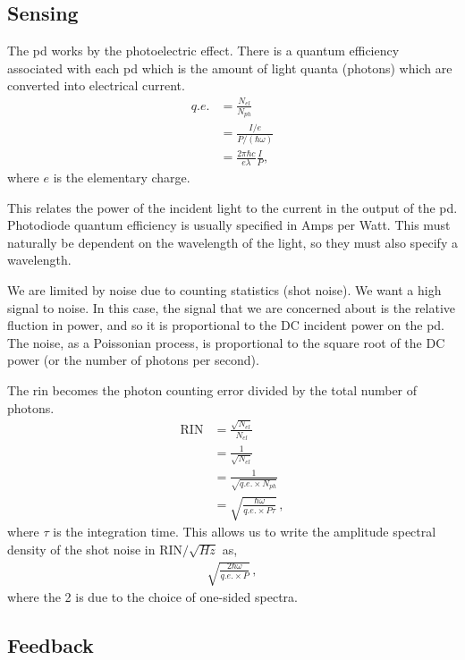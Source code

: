 \subsection{Sensing}

The \ac{pd} works by the photoelectric effect. There is a quantum
efficiency associated with each \ac{pd} which is the amount of light quanta
(photons) which are converted into electrical current.
\begin{align}
q.e. &= \frac{N_{el}}{N_{ph}} \\
     &= \frac{I/e}{P/(\hbar \omega)} \\
     &= \frac{2 \pi \hbar c}{e \lambda} \frac{I}{P} ,
\end{align}
where $e$ is the elementary charge.

This relates the
power of the incident light to the current in the output of the \ac{pd}.
Photodiode quantum efficiency is usually specified in Amps per Watt.
This must naturally be dependent on the wavelength of the light, so they must
also specify a wavelength.

We are limited by noise due to counting statistics (shot noise). We want a high signal
to noise. In this case, the signal that we are concerned about is the
relative fluction in power, and so it is proportional to the DC incident
power on the \ac{pd}. The noise, as a Poissonian process, is proportional
to the square root of the DC power (or the number of photons per second).

The \ac{rin} becomes the photon counting error divided by the total number
of photons.
\begin{align}
\mathrm{RIN} &= \frac{\sqrt{N_{el}}}{N_{el}} \\
     &= \frac{1}{\sqrt{N_{el}}} \\
     &= \frac{1}{\sqrt{q.e. \times N_{ph}}} \\
     &= \sqrt{\frac{\hbar \omega}{q.e. \times P \tau}} \, ,
\end{align}
where $\tau$ is the integration time. This allows us to write the amplitude
spectral density of the shot noise in $\mathrm{RIN} / \sqrt{H\!z}$ as,
\begin{align}
\sqrt{\frac{2 \hbar \omega}{q.e. \times P}} \, ,
\end{align}
where the 2 is due to the choice of one-sided spectra.

\subsection{Feedback}

